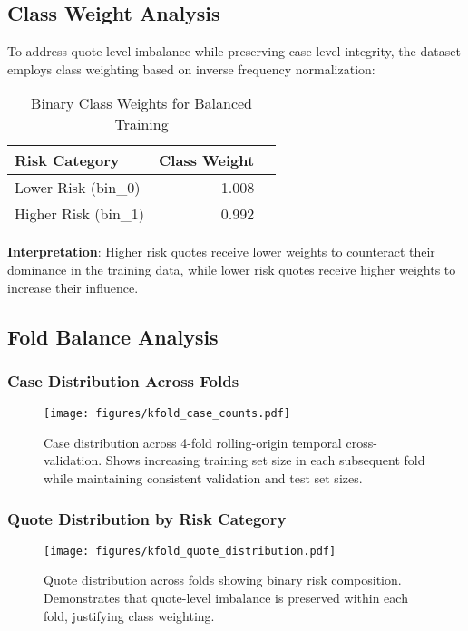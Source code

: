 \documentclass[11pt,a4paper]{article}
\begin{document}
\subsection{Class Weight Analysis}

To address quote-level imbalance while preserving case-level integrity, the dataset employs class weighting based on inverse frequency normalization:


\begin{table}[H]
\centering
\caption{Binary Class Weights for Balanced Training}
\begin{tabular}{lrr}
\toprule
\textbf{Risk Category} & \textbf{Class Weight} \\
\midrule
Lower Risk (bin\_0) & 1.008 \\
Higher Risk (bin\_1) & 0.992 \\

\bottomrule
\end{tabular}
\end{table}

\textbf{Interpretation}: Higher risk quotes receive lower weights to counteract their dominance in the training data, while lower risk quotes receive higher weights to increase their influence.


\subsection{Fold Balance Analysis}

\subsubsection{Case Distribution Across Folds}

\begin{figure}[H]
\centering
\texttt{[image: figures/kfold\_case\_counts.pdf]}
\caption{Case distribution across 4-fold rolling-origin temporal cross-validation. Shows increasing training set size in each subsequent fold while maintaining consistent validation and test set sizes.}
\end{figure}

\subsubsection{Quote Distribution by Risk Category}

\begin{figure}[H]
\centering
\texttt{[image: figures/kfold\_quote\_distribution.pdf]}
\caption{Quote distribution across folds showing binary risk composition. Demonstrates that quote-level imbalance is preserved within each fold, justifying class weighting.}
\end{figure}
\end{document}
